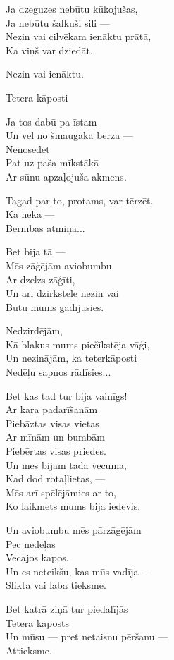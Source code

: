 \documentclass[14pt]{extarticle}
\begin{document}
Ja dzeguzes nebūtu kūkojušas,\\
Ja nebūtu šalkuši sili ---\\
Nezin vai cilvēkam ienāktu prātā,\\
Ka viņš var dziedāt.

Nezin vai ienāktu.


\newpage

{\large \sc  Tetera kāposti}

Ja tos dabū pa īstam\\
Un vēl no šmaugāka bērza ---\\
Nenosēdēt\\
Pat uz paša mīkstākā\\
Ar sūnu apzaļojuša akmens.

Tagad par to, protams, var tērzēt.\\
Kā nekā ---\\
Bērnības atmiņa...

Bet bija tā ---\\
Mēs zāģējām aviobumbu\\
Ar dzelzs zāģīti,\\
Un arī dzirkstele nezin vai\\
Būtu mums gadījusies.

Nedzirdējām,\\
Kā blakus mums piečīkstēja vāģi,\\
Un nezinājām, ka teterkāposti\\
Nedēļu sapņos rādīsies...

Bet kas tad tur bija vainīgs!\\
Ar kara padarīšanām\\
Piebāztas visas vietas\\
Ar mīnām un bumbām\\
Piebērtas visas priedes.\\
Un mēs bijām tādā vecumā,\\
Kad dod rotaļlietas, ---\\
Mēs arī spēlējāmies ar to,\\
Ko laikmets mums bija iedevis.

Un aviobumbu mēs pārzāģējām\\
Pēc nedēļas\\
Vecajos kapos.\\
Un es neteikšu, kas mūs vadīja ---\\
Slikta vai laba tieksme.

Bet katrā ziņā tur piedalījās\\
Tetera kāposts\\
Un mūsu --- pret netaisnu pēršanu ---\\
Attieksme.
\end{document}
